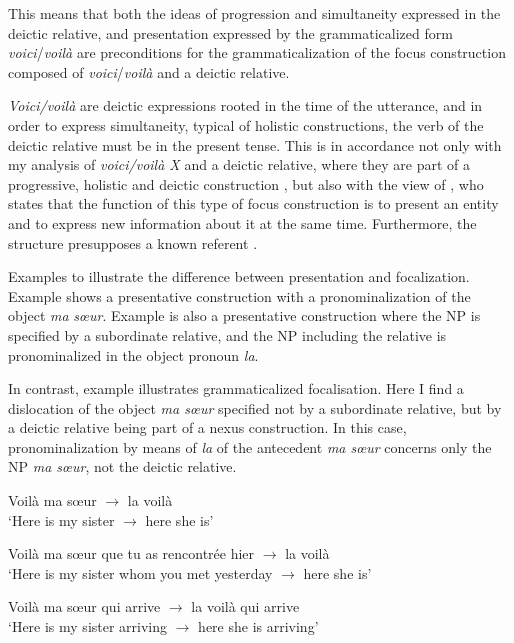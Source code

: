 \documentclass[output=paper]{langsci/langscibook}
\begin{document}
This means that both the ideas of progression and simultaneity expressed in the deictic relative, and presentation expressed by the grammaticalized form \textit{voici}/\textit{voilà} are preconditions for the grammaticalization of the focus construction composed of \textit{voici}/\textit{voilà} and a deictic relative. 

\textit{Voici/voilà} are deictic expressions rooted in the time of the utterance, and in order to express simultaneity, typical of holistic constructions, the verb of the deictic relative must be in the present tense. This is in accordance not only with my analysis of \textit{voici/voilà X} and a deictic relative, where they are part of a progressive, holistic and deictic construction \citep{KraghSchosler2014}, but also with the view of \citet[50--51]{Lambrecht2000}, who states that the function of this type of focus construction is to present an entity and to express new information about it at the same time. Furthermore, the structure presupposes a known referent \citep[456]{RiegelEtAl2009}.

Examples  to  illustrate the difference between presentation and focalization. Example  shows a presentative construction with a pronominalization of the object \textit{ma} \textit{sœur}. Example  is also a presentative construction where the NP is specified by a subordinate relative, and the NP including the relative is pronominalized in the object pronoun \textit{la}.

In contrast, example  illustrates grammaticalized focalisation. Here I find a dislocation of the object \textit{ma sœur} specified not by a subordinate relative, but by a deictic relative being part of a nexus construction. In this case, pronominalization by means of \textit{la} of the antecedent \textit{ma sœur} concerns only the NP \textit{ma sœur}, not the deictic relative. 

\begin{exe}
    \ex \label{ex:kragh:28} Voilà ma sœur  ${\rightarrow}$ la voilà\\
    ‘Here is my sister ${\rightarrow}$ here she is’

    \ex \label{ex:kragh:29} Voilà ma sœur que tu as rencontrée hier ${\rightarrow}$ la voilà\\
    ‘Here is my sister whom you met yesterday ${\rightarrow}$ here she is’

    \ex \label{ex:kragh:30} Voilà ma sœur qui arrive ${\rightarrow}$ la voilà qui arrive\\
    ‘Here is my sister arriving ${\rightarrow}$ here she is arriving’
\end{exe}
\end{document}
